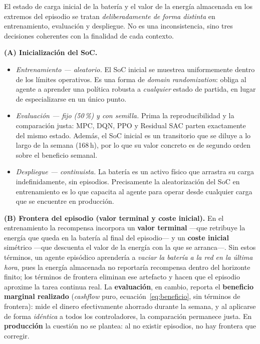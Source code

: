 \documentclass[12pt, a4paper, twoside]{report}
\begin{document}
El estado de carga inicial de la batería y el valor de la energía almacenada en
los extremos del episodio se tratan \emph{deliberadamente de forma distinta} en
entrenamiento, evaluación y despliegue. No es una inconsistencia, sino tres
decisiones coherentes con la finalidad de cada contexto.

\textbf{(A) Inicialización del SoC.}
\begin{itemize}
  \item \emph{Entrenamiento — aleatorio.} El SoC inicial se muestrea
    uniformemente dentro de los límites operativos. Es una forma de
    \textit{domain randomization}: obliga al agente a aprender una política
    robusta a \emph{cualquier} estado de partida, en lugar de especializarse en
    un único punto.
  \item \emph{Evaluación — fijo (50\,\%) y con semilla.} Prima la
    reproducibilidad y la comparación justa: MPC, DQN, PPO y Residual SAC parten
    exactamente del mismo estado. Además, el SoC inicial es un transitorio que se
    diluye a lo largo de la semana (168\,h), por lo que su valor concreto es de
    segundo orden sobre el beneficio semanal.
  \item \emph{Despliegue — continuista.} La batería es un activo físico que
    arrastra su carga indefinidamente, sin episodios. Precisamente la
    aleatorización del SoC en entrenamiento es lo que capacita al agente para
    operar desde cualquier carga que se encuentre en producción.
\end{itemize}

\textbf{(B) Frontera del episodio (valor terminal y coste inicial).} En el
entrenamiento la recompensa incorpora un \textbf{valor terminal} —que retribuye la
energía que queda en la batería al final del episodio— y un \textbf{coste inicial}
simétrico —que descuenta el valor de la energía con la que se arranca—. Sin estos
términos, un agente episódico aprendería a \emph{vaciar la batería a la red en la
última hora}, pues la energía almacenada no reportaría recompensa dentro del
horizonte finito; los términos de frontera eliminan ese artefacto y hacen que el
episodio aproxime la tarea continua real. La \textbf{evaluación}, en cambio,
reporta el \textbf{beneficio marginal realizado} (\emph{cashflow} puro,
ecuación~\eqref{eq:beneficio}, sin términos de frontera): mide el dinero
efectivamente ahorrado durante la semana, y al aplicarse de forma \emph{idéntica}
a todos los controladores, la comparación permanece justa. En \textbf{producción}
la cuestión no se plantea: al no existir episodios, no hay frontera que corregir.
\end{document}

